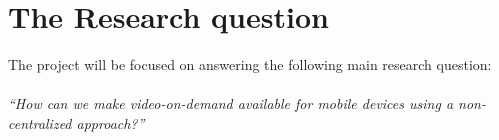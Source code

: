 \section{The Research question}
The project will be focused on answering the following main research question:\\
\\
\textit{``How can we make video-on-demand available for mobile devices using a non-centralized approach?''}


